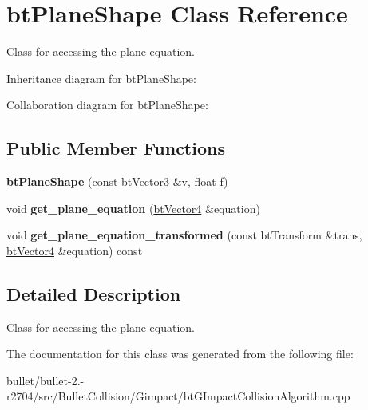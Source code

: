 \hypertarget{classbt_plane_shape}{\section{bt\+Plane\+Shape Class Reference}
\label{classbt_plane_shape}
}


Class for accessing the plane equation.  




Inheritance diagram for bt\+Plane\+Shape\+:


Collaboration diagram for bt\+Plane\+Shape\+:
\subsection*{Public Member Functions}
\begin{DoxyCompactItemize}
\item 
\hypertarget{classbt_plane_shape_afc43ce148f1bb703e8a84cc755f2095d}{{\bfseries bt\+Plane\+Shape} (const bt\+Vector3 \&v, float f)}\label{classbt_plane_shape_afc43ce148f1bb703e8a84cc755f2095d}

\item 
\hypertarget{classbt_plane_shape_af56b67de4a14264bae787e92f9cb488c}{void {\bfseries get\+\_\+plane\+\_\+equation} (\hyperlink{classbt_vector4}{bt\+Vector4} \&equation)}\label{classbt_plane_shape_af56b67de4a14264bae787e92f9cb488c}

\item 
\hypertarget{classbt_plane_shape_a73650be8c7949b089f9b3a378d56dc34}{void {\bfseries get\+\_\+plane\+\_\+equation\+\_\+transformed} (const bt\+Transform \&trans, \hyperlink{classbt_vector4}{bt\+Vector4} \&equation) const }\label{classbt_plane_shape_a73650be8c7949b089f9b3a378d56dc34}

\end{DoxyCompactItemize}


\subsection{Detailed Description}
Class for accessing the plane equation. 

The documentation for this class was generated from the following file\+:\begin{DoxyCompactItemize}
\item 
bullet/bullet-\/2.-\/r2704/src/\+Bullet\+Collision/\+Gimpact/bt\+G\+Impact\+Collision\+Algorithm.\+cpp\end{DoxyCompactItemize}
